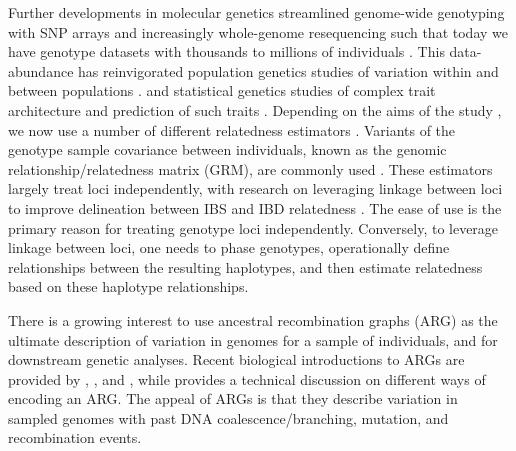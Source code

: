 \begin{tcolorbox}[breakable,pad at break*=1mm, colback=blue!5!white,colframe=blue!75!black,title=Box 1: A Brief History of Genetic Relatedness]

Further developments in molecular genetics streamlined genome-wide
genotyping with SNP arrays and increasingly whole-genome resequencing such
that today we have genotype datasets with thousands to millions of individuals
\citep[e.g.][]{turnbull2018hundred, bycroft2018genome, rosfreixedes2020accuracy}.
%
This data-abundance has reinvigorated population genetics studies of
variation within and between populations
\citep{begun2007population, langley2012genomic}.
and statistical genetics studies of
complex trait architecture \citep{burton2007genome, abdellaoui202315} and
prediction of such traits \citep{meuwissen2001prediction, meuwissen2013accelerating}.
%
Depending on the aims of the study \citep{speed2015relatedness}, we now use
a number of different relatedness estimators
\citep[e.g.][]{vanraden2008efficient, yang2010common, manichaikul2010robust,
speed2012improved, weir2017unified, weir2018how, ochoa2021estimating, maryhuard2023fast}.
%
Variants of the genotype sample covariance between individuals,
known as the genomic relationship/relatedness matrix (GRM),
are commonly used \citep{vanraden2008efficient, yang2010common, speed2012improved}.
%
These estimators largely treat loci independently,
with research on leveraging linkage between loci to improve
delineation between IBS and IBD relatedness
\citep[e.g.][]{visscher2006assumption, browning2012identity, thompson2013identity,
hickey2013genomic, edwards2015two, pook2019haploblocker, saada2020identity}.
%
The ease of use is the primary reason for treating genotype loci independently.
%
Conversely, to leverage linkage between loci, one needs to phase genotypes, operationally
define relationships between the resulting haplotypes, and then estimate relatedness
based on these haplotype relationships.




There is a growing interest to use ancestral recombination graphs (ARG)
as the ultimate description of variation in genomes for a sample of individuals, and
for downstream genetic analyses.
%
Recent biological introductions to ARGs are provided by \cite{lewanski2024era},
\cite{brandt2024promise}, and \cite{nielsen2024inference},
while \cite{wong2023general} provides a technical discussion on different ways
of encoding an ARG.
%
The appeal of ARGs is that they describe variation in sampled genomes with past DNA
coalescence/branching, mutation, and recombination events.


\end{tcolorbox}
